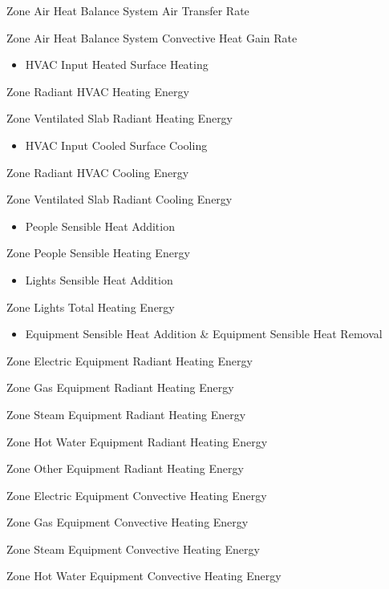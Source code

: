 Zone Air Heat Balance System Air Transfer Rate

Zone Air Heat Balance System Convective Heat Gain Rate

\begin{itemize}
\tightlist
\item
  HVAC Input Heated Surface Heating
\end{itemize}

Zone Radiant HVAC Heating Energy

Zone Ventilated Slab Radiant Heating Energy

\begin{itemize}
\tightlist
\item
  HVAC Input Cooled Surface Cooling
\end{itemize}

Zone Radiant HVAC Cooling Energy

Zone Ventilated Slab Radiant Cooling Energy

\begin{itemize}
\tightlist
\item
  People Sensible Heat Addition
\end{itemize}

Zone People Sensible Heating Energy

\begin{itemize}
\tightlist
\item
  Lights Sensible Heat Addition
\end{itemize}

Zone Lights Total Heating Energy

\begin{itemize}
\tightlist
\item
  Equipment Sensible Heat Addition \& Equipment Sensible Heat Removal
\end{itemize}

Zone Electric Equipment Radiant Heating Energy

Zone Gas Equipment Radiant Heating Energy

Zone Steam Equipment Radiant Heating Energy

Zone Hot Water Equipment Radiant Heating Energy

Zone Other Equipment Radiant Heating Energy

Zone Electric Equipment Convective Heating Energy

Zone Gas Equipment Convective Heating Energy

Zone Steam Equipment Convective Heating Energy

Zone Hot Water Equipment Convective Heating Energy

